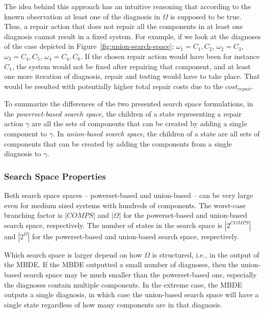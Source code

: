 \documentclass[review]{elsarticle}
\newcommand{\cost}{\textit{cost}}
\newcommand{\COMPS}{\textit{COMPS}}
\begin{document}
The idea behind this approach has an intuitive reasoning that according to the known observation at least one of the diagnosis in $\Omega$ is supposed to be true. Thus, a repair action that does not repair all the components in at least one diagnosis cannot result in a fixed system. For example, if we look at the diagnoses of the case depicted in Figure~\ref{fig:union-search-space}; $\omega_1={C_1,C_2}$, $\omega_2={C_3}$, $\omega_3={C_4,C_5}$, $\omega_4={C_4,C_6}$. If the chosen repair action would have been for instance ${C_1}$, the system would not be fixed after repairing that component, and at least one more iteration of diagnosis, repair and testing would have to take place. That would be resulted with potentially higher total repair costs due to the $\cost_{repair}$.


To summarize the differences of the two presented search space formulations, in the {\em powerset-based search space}, the children of a state representing a repair action $\gamma$ are all the sets of components that can be created by adding a single component to $\gamma$. In {\em union-based search space}, the children of a state are all sets of components that can be created by adding the components from a single diagnosis to $\gamma$. %


\subsubsection{Search Space Properties}
\label{sec:search-space properties}
Both search space spaces -- powerset-based and union-based -- can be very large even for medium sized systems with hundreds of components. 
The worst-case branching factor is $|\COMPS|$ and $|\Omega|$ for the powerset-based and union-based search space, respectively. 
The number of states in the search space is $|2^{\COMPS}|$ and $|2^{\Omega}|$ for the powerset-based and union-based search space, respectively. 

Which search space is larger depend on how $\Omega$ is structured, i.e., in the output of the MBDE. 
If the MBDE outputted a small number of diagnoses, then the union-based search space may be much smaller than the powerset-based one, 
especially the diagnoses contain multiple components. In the extreme case, the MBDE outputs a single diagnosis, in which case 
the union-based search space will have a single state regardless of how many components are in that diagnosis. 
\end{document}
